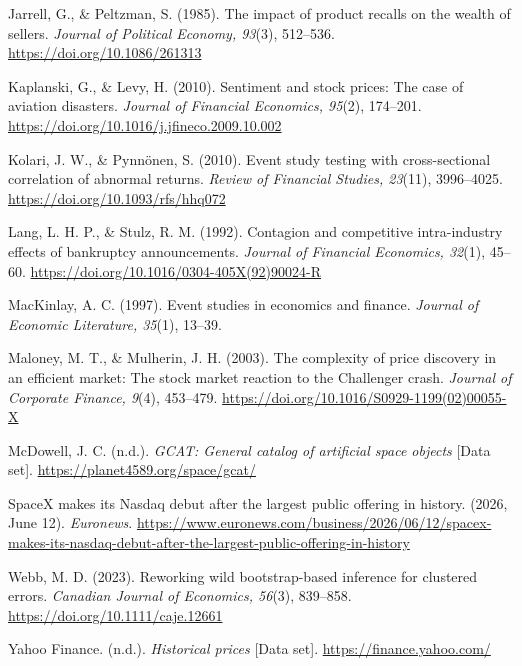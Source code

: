 \documentclass[12pt,a4paper]{article}
\begin{document}
{\noindent\hypertarget{ref-jarrell1985}{}\hangindent=0.5in Jarrell, G., \& Peltzman, S. (1985). The impact of product recalls on the wealth of sellers. \emph{Journal of Political Economy, 93}(3), 512--536. \url{https://doi.org/10.1086/261313}\par
\noindent\hypertarget{ref-kaplanski2010}{}\hangindent=0.5in Kaplanski, G., \& Levy, H. (2010). Sentiment and stock prices: The case of aviation disasters. \emph{Journal of Financial Economics, 95}(2), 174--201. \url{https://doi.org/10.1016/j.jfineco.2009.10.002}\par
\noindent\hypertarget{ref-kolari2010}{}\hangindent=0.5in Kolari, J. W., \& Pynnönen, S. (2010). Event study testing with cross-sectional correlation of abnormal returns. \emph{Review of Financial Studies, 23}(11), 3996--4025. \url{https://doi.org/10.1093/rfs/hhq072}\par
\noindent\hypertarget{ref-lang1992}{}\hangindent=0.5in Lang, L. H. P., \& Stulz, R. M. (1992). Contagion and competitive intra-industry effects of bankruptcy announcements. \emph{Journal of Financial Economics, 32}(1), 45--60. \url{https://doi.org/10.1016/0304-405X(92)90024-R}\par
\noindent\hypertarget{ref-mackinlay1997}{}\hangindent=0.5in MacKinlay, A. C. (1997). Event studies in economics and finance. \emph{Journal of Economic Literature, 35}(1), 13--39.\par
\noindent\hypertarget{ref-maloney2003}{}\hangindent=0.5in Maloney, M. T., \& Mulherin, J. H. (2003). The complexity of price discovery in an efficient market: The stock market reaction to the Challenger crash. \emph{Journal of Corporate Finance, 9}(4), 453--479. \url{https://doi.org/10.1016/S0929-1199(02)00055-X}\par
\noindent\hypertarget{ref-mcdowell}{}\hangindent=0.5in McDowell, J. C. (n.d.). \emph{GCAT: General catalog of artificial space objects} [Data set]. \url{https://planet4589.org/space/gcat/}\par
\noindent\hypertarget{ref-euronews2026}{}\hangindent=0.5in SpaceX makes its Nasdaq debut after the largest public offering in history. (2026, June 12). \emph{Euronews}. \url{https://www.euronews.com/business/2026/06/12/spacex-makes-its-nasdaq-debut-after-the-largest-public-offering-in-history}\par
\noindent\hypertarget{ref-webb2023}{}\hangindent=0.5in Webb, M. D. (2023). Reworking wild bootstrap-based inference for clustered errors. \emph{Canadian Journal of Economics, 56}(3), 839--858. \url{https://doi.org/10.1111/caje.12661}\par
\noindent\hypertarget{ref-yahoo}{}\hangindent=0.5in Yahoo Finance. (n.d.). \emph{Historical prices} [Data set]. \url{https://finance.yahoo.com/}\par
}
\end{document}
